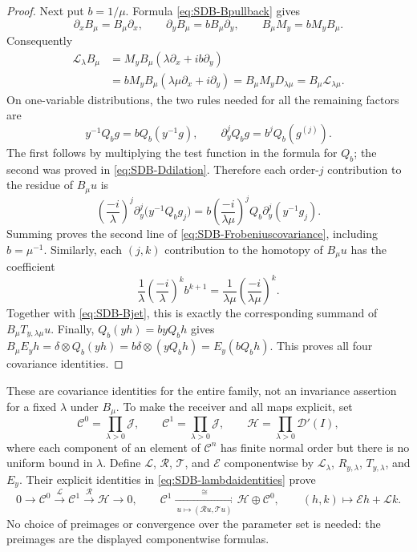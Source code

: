 \begin{proof}
Next put $b=1/\mu$. Formula \eqref{eq:SDB-Bpullback} gives
\[
 \partial_xB_\mu=B_\mu\partial_x,\qquad
 \partial_yB_\mu=bB_\mu\partial_y,\qquad
 B_\mu M_y=bM_yB_\mu.
\]
Consequently
\[
 \begin{aligned}
 \mathcal L_\lambda B_\mu
 &=M_y B_\mu(\lambda\partial_x+ib\partial_y)\\
 &=bM_y B_\mu(\lambda\mu\partial_x+i\partial_y)
 =B_\mu M_yD_{\lambda\mu}
 =B_\mu\mathcal L_{\lambda\mu}.
 \end{aligned}
\]
On one-variable distributions, the two rules needed for all the
remaining factors are
\begin{equation}\tag{SDB51}\label{eq:SDB-bidentities}
 y^{-1}Q_b g=bQ_b(y^{-1}g),\qquad
 \partial_y^j Q_b g=b^jQ_b(g^{(j)}).
\end{equation}
The first follows by multiplying the test function in the formula
for $Q_b$; the second was proved in
\eqref{eq:SDB-Ddilation}. Therefore each order-$j$ contribution to
the residue of $B_\mu u$ is
\[
 \left(\frac{-i}{\lambda}\right)^j
       \partial_y^j\bigl(y^{-1}Q_b g_j\bigr)
 =b\left(\frac{-i}{\lambda\mu}\right)^j
       Q_b\partial_y^j(y^{-1}g_j).
\]
Summing proves the second line of
\eqref{eq:SDB-Frobeniuscovariance}, including $b=\mu^{-1}$.
Similarly, each $(j,k)$ contribution to the homotopy of $B_\mu u$
has the coefficient
\[
 \frac1\lambda\left(\frac{-i}{\lambda}\right)^k b^{k+1}
       =\frac1{\lambda\mu}
           \left(\frac{-i}{\lambda\mu}\right)^k.
\]
Together with \eqref{eq:SDB-Bjet}, this is exactly the corresponding
summand of $B_\mu T_{y,\lambda\mu}u$.
Finally, $Q_b(yh)=byQ_bh$ gives
$B_\mu E_yh=\delta\otimes Q_b(yh)
=b\delta\otimes(yQ_bh)=E_y(bQ_bh)$.
This proves all four covariance identities.
\end{proof}

These are covariance identities for the entire family, not an
invariance assertion for a fixed $\lambda$ under $B_\mu$.
To make the receiver and all maps explicit, set
\begin{equation}\tag{SDB52}\label{eq:SDB-familyspaces}
 \mathcal C^0=\prod_{\lambda>0}\mathcal J,\qquad
 \mathcal C^1=\prod_{\lambda>0}\mathcal J,\qquad
 \mathcal H=\prod_{\lambda>0}\mathcal D'(I),
\end{equation}
where each component of an element of $\mathcal C^n$ has finite
normal order but there is no uniform bound in $\lambda$.
Define $\mathcal L$, $\mathcal R$, $\mathcal T$, and
$\mathcal E$ componentwise by
$\mathcal L_\lambda$, $R_{y,\lambda}$,
$T_{y,\lambda}$, and $E_y$. Their explicit identities in
\eqref{eq:SDB-lambdaidentities} prove
\begin{equation}\tag{SDB53}\label{eq:SDB-familyexact}
 0\longrightarrow\mathcal C^0\xrightarrow{\mathcal L}
       \mathcal C^1\xrightarrow{\mathcal R}\mathcal H
       \longrightarrow0,
 \qquad
 \mathcal C^1\xrightarrow[\ u\mapsto(\mathcal Ru,\mathcal Tu)\ ]
        {\ \cong\ }\mathcal H\oplus\mathcal C^0,
 \qquad(h,k)\longmapsto\mathcal Eh+\mathcal Lk.
\end{equation}
No choice of preimages or convergence over the parameter set is
needed: the preimages are the displayed componentwise formulas.

